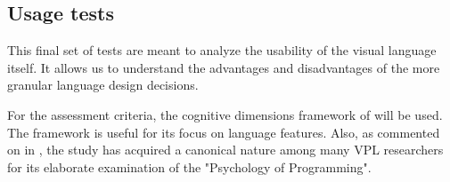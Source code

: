 \subsection{Usage tests}


This final set of tests are meant to analyze the usability of the visual language itself. 
It allows us to understand the advantages and disadvantages of the more granular language design decisions.

For the assessment criteria, the cognitive dimensions framework of \citet{green_usability_1996} will be used. 
The framework is useful for its focus on language features. 
Also, as commented on in , the study has acquired a canonical nature among many VPL researchers for its elaborate examination of the "Psychology of Programming".

